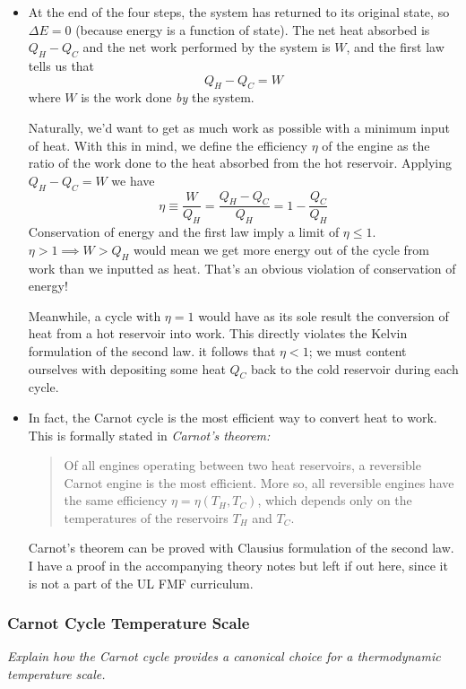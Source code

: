 \documentclass[11pt, a4paper]{article}
\begin{document}
\begin{itemize}
	\item At the end of the four steps, the system has returned to its original state, so $ \Delta E = 0 $ (because energy is a function of state). The net heat absorbed is $ Q_{H} - Q_{C} $ and the net work performed by the system is $ W $, and the first law tells us that
	\begin{equation*}
		Q_{H} - Q_{C} = W
	\end{equation*}
	where $ W $ is the work done \textit{by} the system.
	
	Naturally, we'd want to get as much work as possible with a minimum input of heat. With this in mind, we define the efficiency $ \eta $ of the engine as the ratio of the work done to the heat absorbed from the hot reservoir. Applying $ Q_{H} - Q_{C} = W $ we have
	\begin{equation*}
		\eta \equiv \frac{W}{Q_{H}} = \frac{Q_{H}-Q_{C}}{Q_{H}} = 1 - \frac{Q_{C}}{Q_{H}}
	\end{equation*}
	Conservation of energy and the first law imply a limit of $ \eta \leq 1$. $ \eta > 1 \implies W > Q_{H} $ would mean we get more energy out of the cycle from work than we inputted as heat. That's an obvious violation of conservation of energy! 
	
	Meanwhile, a cycle with $ \eta = 1 $ would have as its sole result the conversion of heat from a hot reservoir into work. This directly violates the Kelvin formulation of the second law. it follows that $ \eta < 1 $; we must content ourselves with depositing some heat $ Q_{C} $ back to the cold reservoir during each cycle. 
	 
	\item In fact, the Carnot cycle is the most efficient way to convert heat to work. This is formally stated in \textit{Carnot's theorem:}
	\begin{quote}
	 	Of all engines operating between two heat reservoirs, a reversible Carnot engine is the most efficient. More so, all reversible engines have the same efficiency $ \eta = \eta (T_{H}, T_{C}) $, which depends only on the temperatures of the reservoirs $ T_{H} $ and $ T_{C} $.
	\end{quote}
	Carnot's theorem can be proved with Clausius formulation of the second law. I have a proof in the accompanying theory notes but left if out here, since it is not a part of the UL FMF curriculum.
\end{itemize}
	
	
\subsubsection{Carnot Cycle Temperature Scale}
\textit{Explain how the Carnot cycle provides a canonical choice for a thermodynamic temperature scale.}
\end{document}
